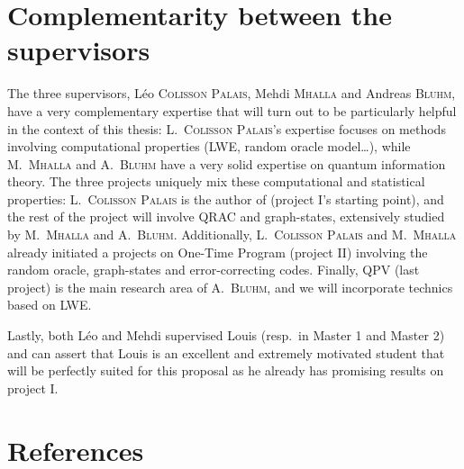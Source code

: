 \section{Complementarity between the supervisors}

The three supervisors, Léo \textsc{Colisson Palais}, Mehdi \textsc{Mhalla} and Andreas \textsc{Bluhm}, have a very complementary expertise that will turn out to be particularly helpful in the context of this thesis: L.~\textsc{Colisson Palais}'s expertise focuses on methods involving computational properties (LWE, random oracle model…), while M.\ \textsc{Mhalla} and A.\ \textsc{Bluhm} have a very solid expertise on quantum information theory. The three projects uniquely mix these computational and statistical properties: L.\ \textsc{Colisson Palais} is the author of \cite{CCKW19_QFactoryClassicallyInstructedRemote} (project I's starting point), and the rest of the project will involve QRAC and graph-states, extensively studied by M.\ \textsc{Mhalla} and A.\ \textsc{Bluhm}. Additionally, L.\ \textsc{Colisson Palais} and M.\ \textsc{Mhalla} already initiated a projects on One-Time Program (project II) involving the random oracle, graph-states and error-correcting codes. Finally, QPV (last project) is the main research area of A.\ \textsc{Bluhm}, and we will incorporate technics based on LWE.

Lastly, both Léo and Mehdi supervised Louis (resp.\ in Master 1 and Master 2) and can assert that Louis is an excellent and extremely motivated student that will be perfectly suited for this proposal as he already has promising results on project I.

\section{References}
\printbibliography[heading=none]




